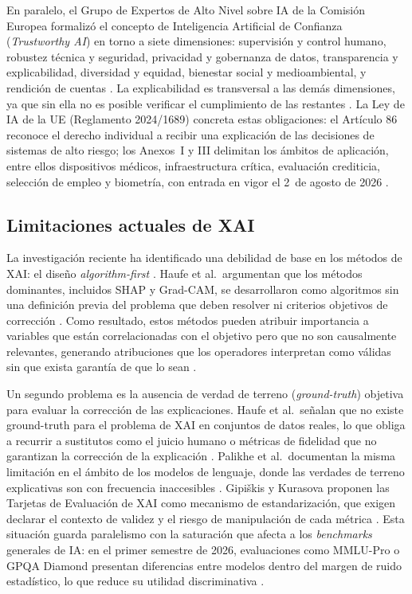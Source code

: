 \documentclass[11pt,a4paper]{article}
\begin{document}
En paralelo, el Grupo de Expertos de Alto Nivel sobre IA de la Comisión Europea
formalizó el concepto de Inteligencia Artificial de Confianza (\textit{Trustworthy AI})
en torno a siete dimensiones: supervisión y control humano, robustez técnica y
seguridad, privacidad y gobernanza de datos, transparencia y explicabilidad,
diversidad y equidad, bienestar social y medioambiental, y rendición de cuentas
\cite{eu_ai_act_2024}.
La explicabilidad es transversal a las demás dimensiones, ya que sin ella no es posible
verificar el cumplimiento de las restantes \cite{binkyte2026trustworthy, binkyte2026causality}.
La Ley de IA de la UE (Reglamento 2024/1689) concreta estas obligaciones:
el Artículo 86 reconoce el derecho individual a recibir una explicación de las
decisiones de sistemas de alto riesgo; los Anexos~I y III delimitan los ámbitos
de aplicación, entre ellos dispositivos médicos, infraestructura crítica,
evaluación crediticia, selección de empleo y biometría,
con entrada en vigor el 2~de agosto de 2026 \cite{eu_ai_act_2024}.

\subsection{Limitaciones actuales de XAI}

La investigación reciente ha identificado una debilidad de base en los métodos de XAI:
el diseño \textit{algorithm-first} \cite{haufe2026explainable}.
Haufe et al.\ argumentan que los métodos dominantes, incluidos SHAP y Grad-CAM,
se desarrollaron como algoritmos sin una definición previa del problema que deben resolver
ni criterios objetivos de corrección \cite{haufe2026explainable}.
Como resultado, estos métodos pueden atribuir importancia a variables que están
correlacionadas con el objetivo pero que no son causalmente relevantes,
generando atribuciones que los operadores interpretan como válidas
sin que exista garantía de que lo sean
\cite{haufe2026explainable, adebayo2018sanity}.

Un segundo problema es la ausencia de verdad de terreno (\textit{ground-truth}) objetiva
para evaluar la corrección de las explicaciones.
Haufe et al.\ señalan que no existe ground-truth para el problema de XAI en conjuntos
de datos reales, lo que obliga a recurrir a sustitutos como el juicio humano o métricas
de fidelidad que no garantizan la corrección de la explicación
\cite{haufe2026explainable}.
Palikhe et al.\ documentan la misma limitación en el ámbito de los modelos de lenguaje,
donde las verdades de terreno explicativas son con frecuencia inaccesibles \cite{palikhe2025towards}.
Gipi\v{s}kis y Kurasova proponen las Tarjetas de Evaluación de XAI como mecanismo
de estandarización, que exigen declarar el contexto de validez y el riesgo de
manipulación de cada métrica \cite{gipiskis2026evaluation}.
Esta situación guarda paralelismo con la saturación que afecta a los
\textit{benchmarks} generales de IA: en el primer semestre de 2026, evaluaciones como
MMLU-Pro o GPQA Diamond presentan diferencias entre modelos dentro del margen de ruido
estadístico, lo que reduce su utilidad discriminativa
\cite{kili_benchmarks_2026, stanford_hai_index_2026}.
\end{document}
